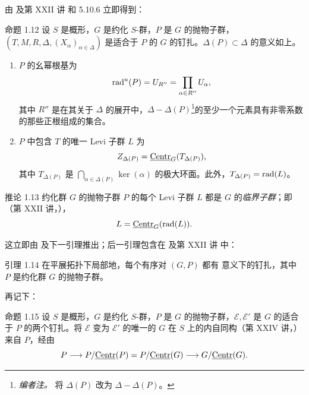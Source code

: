 由 及第 XXII 讲  和 5.10.6 立即得到：
\begin{sgastatement}{命题 1.12}
设 \(S\) 是概形，\(G\) 是约化 \(S\)-群，\(P\) 是 \(G\) 的抛物子群，\((T,M,R,\Delta,(X_\alpha)_{\alpha\in\Delta})\) 是适合于 \(P\) 的 \(G\) 的钉扎。\(\Delta(P)\subset\Delta\) 的意义如上。
\begin{enumerate}[label=\textup{(\roman*)}]
\item \(P\) 的幺幂根基为
\[
 \operatorname{rad}^u(P)=U_{R''}=\prod_{\alpha\in R''}U_\alpha,
\]
其中 \(R''\) 是在其关于 \(\Delta\) 的展开中，\(\Delta-\Delta(P)\)\footnote{\emph{编者注。} 将 \(\Delta(P)\) 改为 \(\Delta-\Delta(P)\)。}的至少一个元素具有非零系数的那些正根组成的集合。
\item \(P\) 中包含 \(T\) 的唯一 Levi 子群 \(L\) 为
\[
 Z_{\Delta(P)}=\underline{\operatorname{Centr}}_G(T_{\Delta(P)}),
\]
其中 \(T_{\Delta(P)}\) 是 \(\bigcap_{\alpha\in\Delta(P)}\ker(\alpha)\) 的极大环面。此外，\(T_{\Delta(P)}=\operatorname{rad}(L)\)。
\end{enumerate}
\end{sgastatement}

\begin{sgastatement}{推论 1.13}
约化群 \(G\) 的抛物子群 \(P\) 的每个 Levi 子群 \(L\) 都是 \(G\) 的\emph{临界子群}；即（第 XXII 讲，），
\[
 L=\underline{\operatorname{Centr}}_G(\operatorname{rad}(L)).
\]
\end{sgastatement}

这立即由  及下一引理推出；后一引理包含在  及第 XXII 讲  中：
\begin{sgastatement}{引理 1.14}
在平展拓扑下局部地，每个有序对 \((G,P)\) 都有  意义下的钉扎，其中 \(P\) 是约化群 \(G\) 的抛物子群。
\end{sgastatement}

再记下：
\begin{sgastatement}{命题 1.15}
设 \(S\) 是概形，\(G\) 是约化 \(S\)-群，\(P\) 是 \(G\) 的抛物子群，\(\mathcal E,\mathcal E'\) 是 \(G\) 的适合于 \(P\) 的两个钉扎。将 \(\mathcal E\) 变为 \(\mathcal E'\) 的唯一的 \(G\) 在 \(S\) 上的内自同构（第 XXIV 讲，）来自 \(P\)，经由
\[
 P\longrightarrow P/\underline{\operatorname{Centr}}(P)
 =P/\underline{\operatorname{Centr}}(G)\longrightarrow G/\underline{\operatorname{Centr}}(G).
\]
\end{sgastatement}

